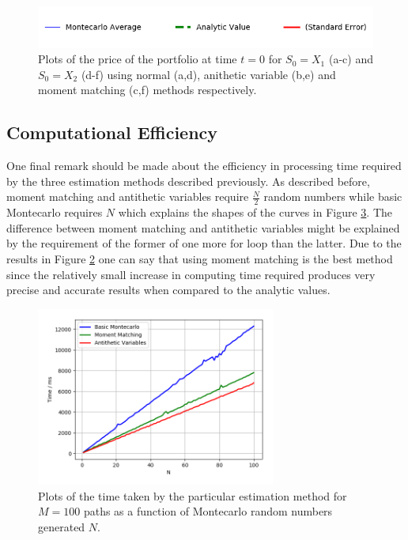 \documentclass{article}
\begin{document}
\begin{figure}[!h]
\begin{minipage}{.5\textwidth}
\begin{subfigure}{\textwidth}
      \label{fig:confidence3}
  \end{subfigure}
\end{minipage}
\includegraphics[width=\linewidth]{legend.png}
\caption{Plots of the price of the portfolio at time $t=0$ for $S_0 = X_1$ (a-c) and $S_0 = X_2$ (d-f) using normal (a,d), anithetic variable (b,e) and moment matching (c,f) methods respectively.}
\label{fig:confidence}
\end{figure}
\clearpage
\subsection*{Computational Efficiency}
One final remark should be made about the efficiency in processing time required by the three estimation methods described previously.
As described before, moment matching and antithetic variables require $\frac{N}{2}$ random numbers while basic Montecarlo requires $N$ which explains
the shapes of the curves in Figure \ref{fig:timing_efficiency}. The difference between moment matching and antithetic variables might be explained by the requirement of the former of one more for loop than the latter.
Due to the results in Figure \ref{fig:confidence} one can say that using moment matching is the best method since the relatively small increase in computing time required produces very precise and accurate results when compared to the analytic values.
\begin{figure}[!th]
\includegraphics[width=0.7\textwidth,center]{timing_efficiency_100.png}
\caption{Plots of the time taken by the particular estimation method for $M=100$ paths as a function of Montecarlo random numbers generated $N$.}
\label{fig:timing_efficiency}
\end{figure}
\end{document}
